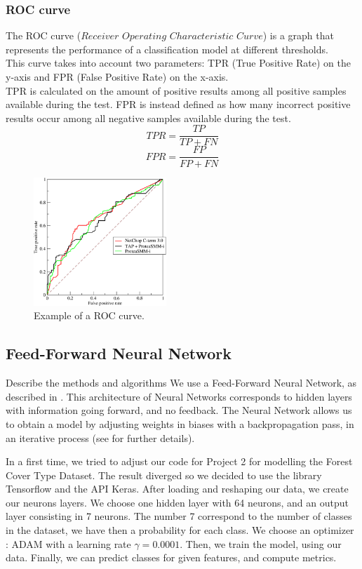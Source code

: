 \documentclass[letterpaper,12pt]{article}
\begin{document}
\subsubsection{ROC curve}
The ROC curve ($Receiver$ $Operating$ $Characteristic$ $Curve$) is a graph that represents the performance of a classification model at different thresholds.\\
This curve takes into account two parameters: TPR (True Positive Rate) on the y-axis and FPR (False Positive Rate) on the x-axis.\\
TPR is calculated on the amount of positive results among all positive samples available during the test. FPR is instead defined as how many incorrect positive results occur among all negative samples available during the test.
    \begin{equation}
        TPR = \frac{TP}{TP+FN}
    \end{equation}
    \begin{equation}
        FPR = \frac{FP}{FP+FN}
    \end{equation}
    \begin{figure}[H]
    \centering
    \includegraphics[width=5cm]{ROCex.png}
    \caption{\centering Example of a ROC curve. \cite{ROC_wifi}}
    \label{cross}
\end{figure}
\subsection{Feed-Forward Neural Network}
\par Describe the methods and algorithms
We use a Feed-Forward Neural Network, as described in \cite{proj2}. This architecture of Neural Networks corresponds to hidden layers with information going forward, and no feedback. The Neural Network allows us to obtain a model by adjusting weights in biases with a backpropagation pass, in an iterative process (see \cite{proj2} for further details).
\par In a first time, we tried to adjust our code for Project 2 for modelling the Forest Cover Type Dataset. The result diverged so we decided to use the library Tensorflow and the API Keras. After loading and reshaping our data, we create our neurons layers. We choose one hidden layer with 64 neurons, and an output layer consisting in 7 neurons. The number 7 correspond to the number of classes in the dataset, we have then a probability for each class. We choose an optimizer : ADAM with a learning rate $\gamma = 0.0001$. Then, we train the model, using our data. Finally, we can predict classes for given features, and compute metrics.
\end{document}
